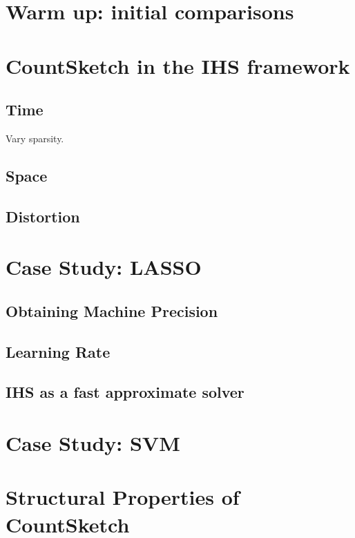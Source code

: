 \documentclass[twoside]{article}
\theoremstyle{definition}\newtheorem{thm}{Theorem}[section]
\theoremstyle{definition}\newtheorem{mydef}[thm]{Definition}
\theoremstyle{definition}\newtheorem{rem}[thm]{Remark}
\theoremstyle{definition}\newtheorem{prop}[thm]{Proposition}
\theoremstyle{definition}\newtheorem{example}[thm]{Example}
\theoremstyle{definition}\newtheorem{claim}[thm]{Claim}
\theoremstyle{definition}\newtheorem{Qu}[thm]{Question}
\theoremstyle{definition}\newtheorem{Lemma}[thm]{Lemma}
\theoremstyle{definition}\newtheorem{Cor}[thm]{Corollary}
\theoremstyle{definition}\newtheorem{Fact}[]{Fact}
\begin{document}
\section{Warm up: initial comparisons}



\section{CountSketch in the IHS framework} \label{sec: countsketch-ihs}





\subsection{Time}
Vary sparsity.
\subsection{Space}

\subsection{Distortion}



\section{Case Study: LASSO}


\subsection{Obtaining Machine Precision}

\subsection{Learning Rate}

\subsection{IHS as a fast approximate solver}

\section{Case Study: SVM}


\appendix

\section{Structural Properties of CountSketch} \label{sec: countsketch-proofs}







\end{document}
